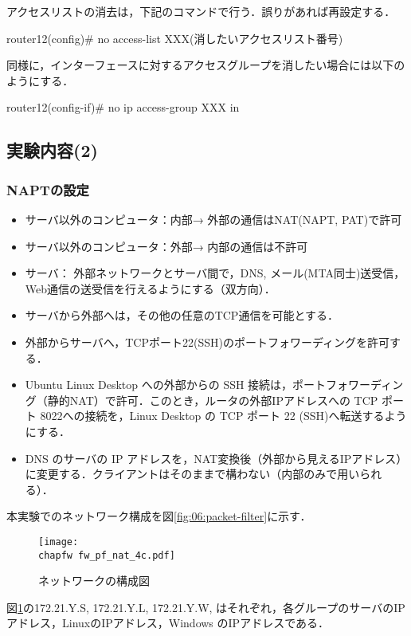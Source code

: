 アクセスリストの消去は，下記のコマンドで行う．誤りがあれば再設定する．
\begin{cli}
router12(config)# no access-list XXX(消したいアクセスリスト番号)
\end{cli}

同様に，インターフェースに対するアクセスグループを消したい場合には以下のようにする．
\begin{cli}
router12(config-if)# no ip access-group XXX in
\end{cli}

\clearpage

\subsection{実験内容(2)}

\subsubsection{NAPTの設定}

\begin{itemize}
 \item サーバ以外のコンピュータ：内部→ 外部の通信はNAT(NAPT, PAT)で許可
 \item サーバ以外のコンピュータ：外部→ 内部の通信は不許可
 \item サーバ： 外部ネットワークとサーバ間で，DNS, メール(MTA同士)送受信，Web通信の送受信を行えるようにする（双方向）．
 \item サーバから外部へは，その他の任意のTCP通信を可能とする．
 \item 外部からサーバへ，TCPポート22(SSH)のポートフォワーディングを許可する．
 \item Ubuntu Linux Desktop への外部からの SSH 接続は，ポートフォワーディング（静的NAT）で許可．このとき，ルータの外部IPアドレスへの TCP ポート 8022への接続を，Linux Desktop の TCP ポート 22 (SSH)へ転送するようにする． 
 \item DNS のサーバの IP アドレスを，NAT変換後（外部から見えるIPアドレス）に変更する．クライアントはそのままで構わない（内部のみで用いられる）．
\end{itemize}
本実験でのネットワーク構成を図\ref{fig:06:packet-filter}に示す．
\begin{figure}
  \centering
  \texttt{[image: \\chapfw fw\_pf\_nat\_4c.pdf]}
  \caption{ネットワークの構成図}
  \label{fig:06:nat}
\end{figure}
図\ref{fig:06:nat}の172.21.Y.S, 172.21.Y.L, 172.21.Y.W, はそれぞれ，各グループのサーバのIPアドレス，LinuxのIPアドレス，Windows のIPアドレスである．


